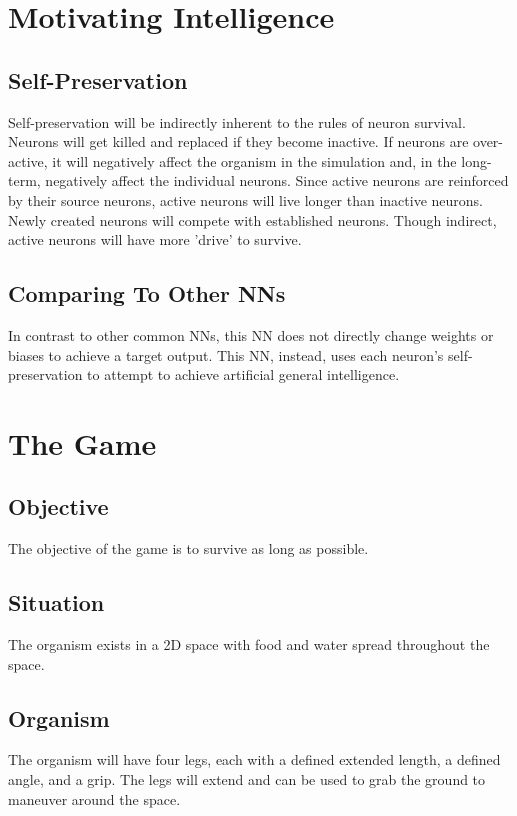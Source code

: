 \documentclass{article} %
\begin{document}
    \section{Motivating Intelligence}
        
        \subsection{Self-Preservation}
            Self-preservation will be indirectly inherent to the rules of neuron survival. Neurons will get killed and replaced if they become inactive. If neurons are over-active, it will negatively affect the organism in the simulation and, in the long-term, negatively affect the individual neurons. Since active neurons are reinforced by their source neurons, active neurons will live longer than inactive neurons. Newly created neurons will compete with established neurons. Though indirect, active neurons will have more 'drive' to survive.
        
        \subsection{Comparing To Other NNs}
            In contrast to other common NNs, this NN does not directly change weights or biases to achieve a target output. This NN, instead, uses each neuron's self-preservation to attempt to achieve artificial general intelligence.


    \section{The Game}
        
        \subsection{Objective}
            The objective of the game is to survive as long as possible.
        
        \subsection{Situation}
            The organism exists in a 2D space with food and water spread throughout the space.
        
        \subsection{Organism}
            The organism will have four legs, each with a defined extended length, a defined angle, and a grip. The legs will extend and can be used to grab the ground to maneuver around the space.
\end{document}
